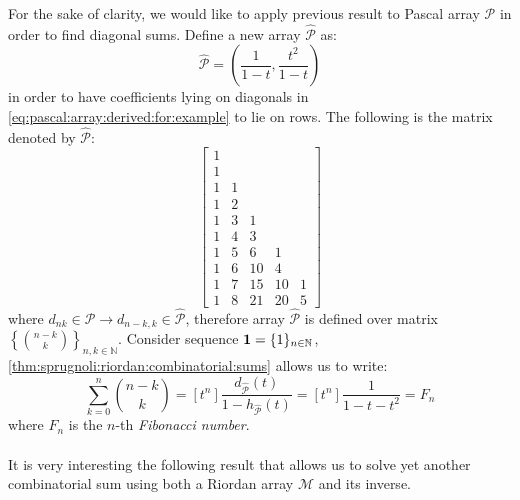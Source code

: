 For the sake of clarity, we would like to apply previous result to
Pascal array $\mathcal{P}$ in order to find diagonal sums. Define
a new array $\hat{\mathcal{P}}$ as:
\begin{equation}
    \hat{\mathcal{P}}=\left(\frac{1}{1-t},\frac{t^{2}}{1-t}\right)
    \label{eq:pascal:array:for:diagonals}
\end{equation}
in order to have coefficients lying on diagonals in \autoref{eq:pascal:array:derived:for:example}
to lie on rows. The following is the matrix denoted by $\hat{\mathcal{P}}$:
\begin{displaymath} 
    \left[
    \begin{array}{rrrrr}
    1 &  &  &  &   \\
    1 &  &  &  &   \\
    1 & 1 &  &  &   \\
    1 & 2 &  &  &   \\
    1 & 3 & 1 &  &   \\
    1 & 4 & 3 &  &   \\
    1 & 5 & 6 & 1 &   \\
    1 & 6 & 10 & 4 &  \\
    1 & 7 & 15 & 10 & 1 \\
    1 & 8 & 21 & 20 & 5 
    \end{array}
    \right] 
\end{displaymath}
where $d_{nk}\in\mathcal{P} \rightarrow d_{n-k,k}\in\hat{\mathcal{P}}$, 
therefore array $\hat{\mathcal{P}}$ is defined over matrix 
$\left\lbrace{{n-k}\choose{k}}\right\rbrace_{n,k\in\mathbb{N}}$.
Consider sequence $\boldsymbol{1}=\lbrace1\rbrace_{n\in\mathbb{N}}$, 
\autoref{thm:sprugnoli:riordan:combinatorial:sums} allows us to write:
\begin{displaymath}
    \sum_{k=0}^{n}{{{n-k}\choose{k}}}=[t^{n}]
        \frac{d_{\hat{\mathcal{P}}}(t)}{1-h_{\hat{\mathcal{P}}}(t)}
        =[t^{n}]\frac{1}{1-t-t^{2}}
        =F_{n}
\end{displaymath}
where $F_{n}$ is the $n$-th \emph{Fibonacci number}.
\\\\
It is very interesting the following result that allows us to solve
yet another combinatorial sum using both a Riordan array $\mathcal{M}$
and its inverse.

